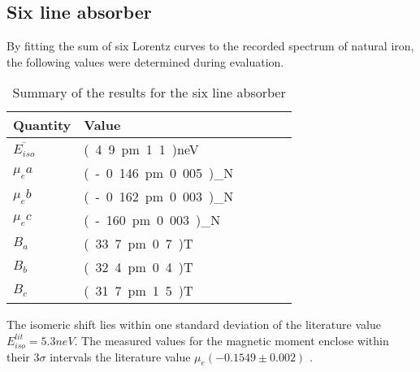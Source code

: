 \subsection{Six line absorber}
By fitting the sum of six Lorentz curves to the recorded spectrum of natural iron, the following values were determined during evaluation.
\begin{table}[H]\centering
	\begin{tabular}{@{}llllll@{}}
		\toprule
		 Quantity& Value \\
		\midrule
		$\overline{E_{iso}}$ & \unit{(4.9\pm1.1)}{neV}\\
		$\mu_ea$ & \unit{(-0.146\pm0.005)}{\mu_N} \\
		$\mu_eb$ & \unit{(-0.162\pm0.003)}{\mu_N}\\
		$\mu_ec$ & \unit{(-160\pm0.003)}{\mu_N}\\
		$B_a$ & \unit{(33.7\pm0.7)}{T}  \\
		$B_b$ & \unit{(32.4\pm0.4)}{T}  \\
		$B_c$ & \unit{(31.7\pm1.5)}{T}  \\ 
		\bottomrule
	\end{tabular}
	\caption[Summary six line absorber]{Summary of the results for the six line absorber}
	\label{tb:summary:sixline abs}
\end{table}
The isomeric shift lies within one standard deviation of the literature value $E^{lit}_{iso}=\unit{5.3}{neV}$. The measured values for the magnetic moment enclose within their 3$\sigma$ intervals the literature value $\mu_e (-0.1549\pm0.002)$ \cite{stone}.
